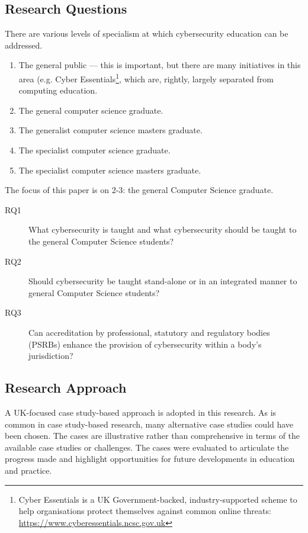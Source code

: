 \documentclass[conference]{IEEEtran}
\begin{document}
\subsection{Research Questions}
There are various levels of specialism at which cybersecurity education can be addressed.
\begin{enumerate}
\item The general public --- this is important, but there are many initiatives in this area (e.g. Cyber Essentials\footnote{Cyber Essentials is a UK Government-backed, industry-supported scheme to help organisations protect themselves against common online threats: \url{https://www.cyberessentials.ncsc.gov.uk}}, which are, rightly, largely separated from computing education.
\item The general computer science graduate.
\item The generalist computer science masters graduate.
\item The specialist computer science graduate.
\item The specialist computer science masters graduate.
\end{enumerate}
The focus of this paper is on 2-3: the general Computer Science graduate.
\begin{description}
\item[RQ1]What cybersecurity is taught and what cybersecurity should be taught to the general Computer Science  students?
\item[RQ2]Should cybersecurity be taught stand-alone or in an integrated manner to general Computer Science students?
\item[RQ3]Can accreditation by professional, statutory and regulatory bodies (PSRBs) enhance the provision of cybersecurity within a body's jurisdiction?
\end{description}

\subsection{Research Approach}
A UK-focused case study-based approach is adopted in this research. As is common in case study-based research, many alternative case studies could have been chosen. The cases are illustrative rather than comprehensive in terms of the available case studies or challenges. The cases were evaluated to articulate the progress made and highlight opportunities for future developments in education and practice. 
\end{document}
